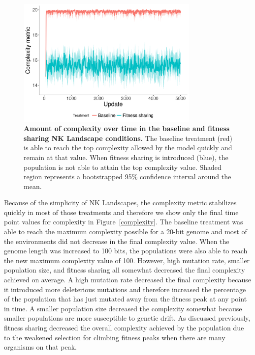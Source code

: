 \documentclass[letterpaper]{article}
\begin{document}
\begin{figure}
\includegraphics[width=3.5in]{figs/complexity_fitness_sharing.png}
\caption{\textbf{Amount of complexity over time in the baseline and fitness sharing NK Landscape conditions.} The baseline treatment (red) is able to reach the top complexity allowed by the model quickly and remain at that value. When fitness sharing is introduced (blue), the population is not able to attain the top complexity value. Shaded region represents a bootstrapped 95\% confidence interval around the mean.}
\label{complexity_time}
\end{figure}

Because of the simplicity of NK Landscapes, the complexity metric stabilizes quickly in most of those treatments and therefore we show only the final time point values for complexity in Figure~\ref{complexity}. The baseline treatment was able to reach the maximum complexity possible for a 20-bit genome and most of the environments did not decrease in the final complexity value. When the genome length was increased to 100 bits, the populations were also able to reach the new maximum complexity value of 100. However, high mutation rate, smaller population size, and fitness sharing all somewhat decreased the final complexity achieved on average. A high mutation rate decreased the final complexity because it introduced more deleterious mutations and therefore increased the percentage of the population that has just mutated away from the fitness peak at any point in time. A smaller population size decreased the complexity somewhat because smaller populations are more susceptible to genetic drift. As discussed previously, fitness sharing decreased the overall complexity achieved by the population due to the weakened selection for climbing fitness peaks when there are many organisms on that peak.
\end{document}
